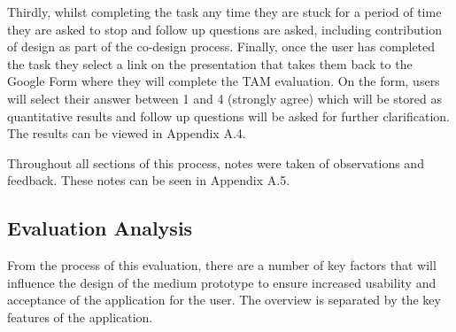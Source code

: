 \documentclass[a4 paper, 12pt]{article}
\begin{document}
Thirdly, whilst completing the task any time they are stuck for a period of time they are asked to stop and follow up questions are asked, including contribution of design as part of the co-design process. Finally, once the user has completed the task they select a link on the presentation that takes them back to the Google Form where they will complete the TAM evaluation. On the form, users will select their answer between 1 and 4 (strongly agree) which will be stored as quantitative results and follow up questions will be asked for further clarification. The results can be viewed in Appendix A.4.

Throughout all sections of this process, notes were taken of observations and feedback. These notes can be seen in Appendix A.5.

\subsection{Evaluation Analysis}
From the process of this evaluation, there are a number of key factors that will influence the design of the medium prototype to ensure increased usability and acceptance of the application for the user. The overview is separated by the key features of the application.
\end{document}
